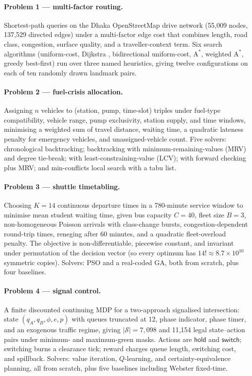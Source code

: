 \documentclass[11pt]{article}
\newcommand{\hold}{\textsf{hold}}
\newcommand{\swi}{\textsf{switch}}
\begin{document}
\paragraph{Problem 1 --- multi-factor routing.} Shortest-path queries on the Dhaka OpenStreetMap
drive network (55,009 nodes, 137,529 directed edges) under a multi-factor edge cost that
combines length, road class, congestion, surface quality, and a traveller-context term. Six search
algorithms (uniform-cost, Dijkstra \citep{dijkstra1959note}, bidirectional uniform-cost,
$\mathrm{A}^*$, weighted $\mathrm{A}^*$, greedy best-first) run over three named heuristics, giving
twelve configurations on each of ten randomly drawn landmark pairs.

\paragraph{Problem 2 --- fuel-crisis allocation.} Assigning $n$ vehicles to
(station, pump, time-slot) triples under fuel-type compatibility, vehicle range, pump exclusivity,
station supply, and time windows, minimising a weighted sum of travel distance, waiting time, a
quadratic lateness penalty for emergency vehicles, and unassigned-vehicle count. Five solvers:
chronological backtracking; backtracking with minimum-remaining-values (MRV) and degree tie-break;
with least-constraining-value (LCV); with forward checking plus MRV; and min-conflicts local search
with a tabu list.

\paragraph{Problem 3 --- shuttle timetabling.} Choosing $K = 14$ continuous departure times in a
780-minute service window to minimise mean student waiting time, given bus capacity $C = 40$,
fleet size $B = 3$, non-homogeneous Poisson arrivals with class-change bursts, congestion-dependent
round-trip times, reneging after 60 minutes, and a quadratic fleet-overload penalty. The objective
is non-differentiable, piecewise constant, and invariant under permutation of the decision vector
(so every optimum has $14! \approx 8.7\times 10^{10}$ symmetric copies). Solvers: PSO and a
real-coded GA, both from scratch, plus four baselines.

\paragraph{Problem 4 --- signal control.} A finite discounted continuing MDP for a two-approach
signalised intersection: state $(q_A, q_B, \phi, e, p)$ with queues truncated at 12, phase
indicator, phase timer, and an exogenous traffic regime, giving $|\mathcal{S}| = 7,098$ and
11,154 legal state--action pairs under minimum- and maximum-green masks. Actions are $\hold$
and $\swi$; switching burns a clearance tick; reward charges queue length, switching cost, and
spillback. Solvers: value iteration, $Q$-learning, and certainty-equivalence planning, all from
scratch, plus five baselines including Webster fixed-time.
\end{document}
